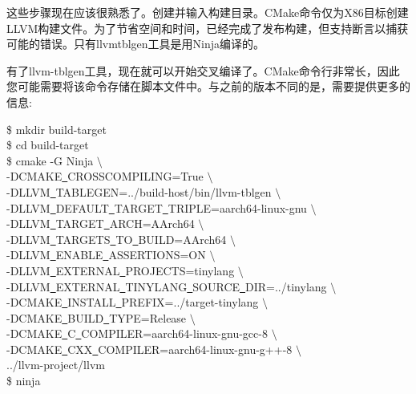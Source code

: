 这些步骤现在应该很熟悉了。创建并输入构建目录。CMake命令仅为X86目标创建LLVM构建文件。为了节省空间和时间，已经完成了发布构建，但支持断言以捕获可能的错误。只有llvmtblgen工具是用Ninja编译的。\par

有了llvm-tblgen工具，现在就可以开始交叉编译了。CMake命令行非常长，因此您可能需要将该命令存储在脚本文件中。与之前的版本不同的是，需要提供更多的信息:\par

\begin{tcolorbox}[colback=white,colframe=black]
	\$ mkdir build-target \\
	\$ cd build-target \\
	\$ cmake -G Ninja $\setminus$ \\
	\hspace*{1cm}-DCMAKE\underline{~}CROSSCOMPILING=True $\setminus$ \\
	\hspace*{1cm}-DLLVM\underline{~}TABLEGEN=../build-host/bin/llvm-tblgen $\setminus$ \\
	\hspace*{1cm}-DLLVM\underline{~}DEFAULT\underline{~}TARGET\underline{~}TRIPLE=aarch64-linux-gnu $\setminus$ \\
	\hspace*{1cm}-DLLVM\underline{~}TARGET\underline{~}ARCH=AArch64 $\setminus$ \\
	\hspace*{1cm}-DLLVM\underline{~}TARGETS\underline{~}TO\underline{~}BUILD=AArch64 $\setminus$ \\
	\hspace*{1cm}-DLLVM\underline{~}ENABLE\underline{~}ASSERTIONS=ON $\setminus$ \\
	\hspace*{1cm}-DLLVM\underline{~}EXTERNAL\underline{~}PROJECTS=tinylang $\setminus$ \\
	\hspace*{1cm}-DLLVM\underline{~}EXTERNAL\underline{~}TINYLANG\underline{~}SOURCE\underline{~}DIR=../tinylang $\setminus$ \\
	\hspace*{1cm}-DCMAKE\underline{~}INSTALL\underline{~}PREFIX=../target-tinylang $\setminus$ \\	\hspace*{1cm}-DCMAKE\underline{~}BUILD\underline{~}TYPE=Release $\setminus$ \\
	\hspace*{1cm}-DCMAKE\underline{~}C\underline{~}COMPILER=aarch64-linux-gnu-gcc-8 $\setminus$ \\
	\hspace*{1cm}-DCMAKE\underline{~}CXX\underline{~}COMPILER=aarch64-linux-gnu-g++-8 $\setminus$ \\
	\hspace*{1cm}../llvm-project/llvm \\
	\$ ninja
\end{tcolorbox}

